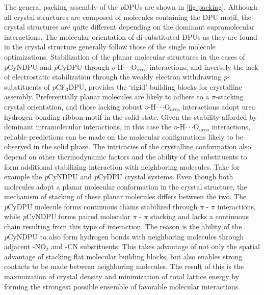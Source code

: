 The general packing assembly of the \textit{p}DPUs are shown in \autoref{fig:packing}. Although all crystal structures are composed of molecules containing the DPU motif, the crystal structures are quite different depending on the dominant supramolecular interactions. The molecular orientation of di-substituted DPUs as they are found in the crystal structure generally follow those of the single molecule optimizations. Stabilization of the planar molecular structures in the cases of \textit{p}CyNDPU and \textit{p}CyDPU through \textit{o}-H$\cdot \cdot \cdot$O$_{urea}$ interactions, and inversely the lack of electrostatic stabilization through the weakly electron withdrawing \textit{p}-substituents of \textit{p}CF$_{3}$DPU, provides the `rigid' building blocks for crystalline assembly. Preferentially planar molecules are likely to adhere to a $\pi$-stacking crystal orientation, and those lacking robust \textit{o}-H$\cdot \cdot \cdot$O$_{urea}$ interactions adopt urea hydrogen-bonding ribbon motif in the solid-state. Given the stability afforded by dominant intramolecular interactions, in this case the \textit{o}-H$\cdot \cdot \cdot$O$_{urea}$ interactions, reliable predictions can be made on the molecular configurations likely to be observed in the solid phase. The intricacies of the crystalline conformation also depend on other thermodynamic factors and the ability of the substituents to form additional stabilizing interaction with neighboring molecules. Take for example the \textit{p}CyNDPU and \textit{p}CyDPU crystal systems. Even though both molecules adopt a planar molecular conformation in the crystal structure, the mechanism of stacking of these planar molecules differs between the two. The \textit{p}CyDPU molecule forms continuous chains stabilized through $\pi$ - $\pi$ interactions, while \textit{p}CyNDPU forms paired molecular $\pi$ - $\pi$ stacking and lacks a continuous chain resulting from this type of interaction. The reason is the ability of the \textit{p}CyNDPU to also form hydrogen bonds with neighboring molecules through adjacent -NO$_{2}$ and -CN substituents. This takes advantage of not only the spatial advantage of stacking flat molecular building blocks, but also enables strong contacts to be made between neighboring molecules. The result of this is the maximization of crystal density and minimization of total lattice energy by forming the strongest possible ensemble of favorable molecular interactions.  


